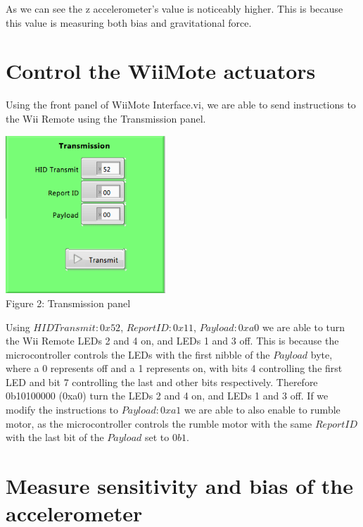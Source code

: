 \documentclass[twoside]{article}
\begin{document}
\begin{multicols}{2}
\noindent As we can see the z accelerometer's value is noticeably higher. This is because this value is measuring both bias and gravitational force.


\section{Control the WiiMote actuators}

Using the front panel of WiiMote Interface.vi, we are able to send instructions to the Wii Remote using the Transmission panel.

\begin{center}
\includegraphics*[width = 6cm]{FIG2.png}\\
Figure 2: Transmission panel
\end{center}

\noindent Using $HID Transmit: 0x52$, $Report ID: 0x11$, $Payload: 0xa0$ we are able to turn the Wii Remote LEDs 2 and 4 on, and LEDs 1 and 3 off. This is because the microcontroller controls the LEDs with the first nibble of the $Payload$ byte, where a 0 represents off and a 1 represents on, with bits 4 controlling the first LED and bit 7 controlling the last and other bits respectively. Therefore 0b10100000 (0xa0) turn the LEDs 2 and 4 on, and LEDs 1 and 3 off. If we modify the instructions to $Payload: 0xa1$ we are able to also enable to rumble motor, as the microcontroller controls the rumble motor with the same $Report ID$ with the last bit of the $Payload$ set to $0b1$.


\section{Measure sensitivity and bias of the accelerometer}


\end{multicols}
\end{document}
